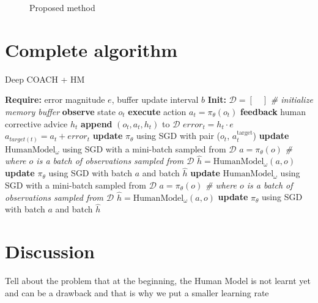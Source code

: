 \begin{figure}[H]
    \centering
    
    \caption{Proposed method}
    \label{fig:method_diagram}
\end{figure}



\section{Complete algorithm}
\label{section:Complete algorithm}


\begin{algorithm}[H]
\caption{Deep COACH + HM}\label{algorithm:DeepCOACH}
\begin{algorithmic}[1]
\State \textbf{Require:} error magnitude $e$, buffer update interval $b$
\State \textbf{Init:} $\mathcal{D} = [\quad]$  \emph{\# initialize memory buffer}
\State \textbf{observe} state $o_{t}$
\State \textbf{execute} action $a_{t}=\pi_{\theta}(o_{t})$
\State \textbf{feedback} human corrective advice $h_{t}$
\State \textbf{append} $(o_{t}, a_{t}, h_{t})$ to $\mathcal{D}$
\State $\mathit{error}_{t} = h_{t}\cdot e$
\State $a_{target(t)} = a_{t} + \mathit{error}_{t}$
\State \textbf{update} $\pi_\theta$ using SGD with pair ($o_{t}$, $a^{\text{target}}_{t}$)
\State \textbf{update} $\text{HumanModel}_\omega$ using SGD with a mini-batch sampled from $\mathcal{D}$
\State  $a=\pi_{\theta}(o)$ \emph{\# where $o$ is a batch of observations sampled from $\mathcal{D}$}
\State  $\hat{h}=\text{HumanModel}_\omega(a, o)$
\State \textbf{update} $\pi_\theta$ using SGD with batch $a$ and batch $\hat{h}$
\EndIf
{}
\State \textbf{update} $\text{HumanModel}_\omega$ using SGD with a mini-batch sampled from $\mathcal{D}$
\State  $a=\pi_{\theta}(o)$ \emph{\# where $o$ is a batch of observations sampled from $\mathcal{D}$}
\State  $\hat{h}=\text{HumanModel}_\omega(a, o)$
\State \textbf{update} $\pi_{\theta}$ using SGD with batch $a$ and batch $\hat{h}$
\EndIf
\EndFor
\end{algorithmic}
\label{al:D-COACH with HM}
\end{algorithm}


\section{Discussion}
\label{section:Algorithm-Discussion}
Tell about the problem that at the beginning, the Human Model is not learnt yet and can be a drawback and that is why we put a smaller learning rate